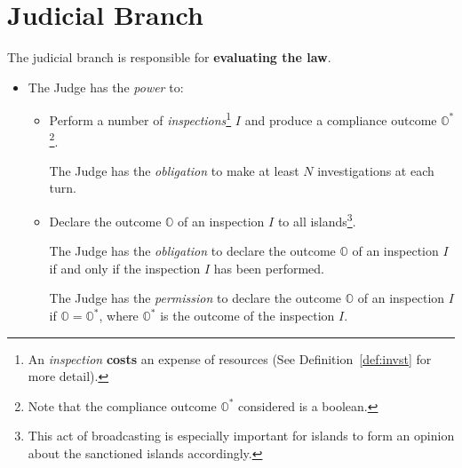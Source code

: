 \section{Judicial Branch}
\label{sec:judicial}

The judicial branch is responsible for \textbf{evaluating the law}.
\begin{itemize}
    \item The Judge has the \emph{power} to:
    \begin{itemize}
        \item Perform a number of \emph{inspections}\footnote{An \emph{inspection} \textbf{costs} an expense of resources (See Definition~\ref{def:invst} for more detail).} $I$ and produce a compliance outcome $\mathbb{O}^{*}$\footnote{Note that the compliance outcome $\mathbb{O}^{*}$ considered is a boolean.}.
        \begin{rule_IIGO}
            The Judge has the \emph{obligation} to make at least $N$ investigations at each turn.
        \end{rule_IIGO}
        \item Declare the outcome $\mathbb{O}$ of an inspection $I$ to all islands\footnote{This act of broadcasting is especially important for islands to form an opinion about the sanctioned islands accordingly.}.
        \begin{rule_IIGO}
            The Judge has the \emph{obligation} to declare the outcome $\mathbb{O}$ of an inspection $I$ if and only if the inspection $I$ has been performed.
        \end{rule_IIGO}
        \begin{rule_IIGO}
            The Judge has the \emph{permission} to declare the outcome $\mathbb{O}$ of an inspection $I$ if $\mathbb{O} = \mathbb{O}^{*}$, where $\mathbb{O}^{*}$ is the outcome of the inspection $I$.
        \end{rule_IIGO}

\end{itemize}
\end{itemize}
